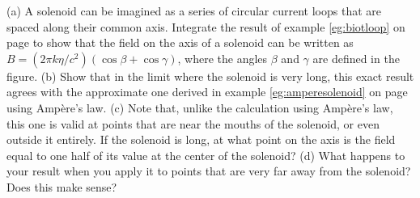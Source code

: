         (a) A solenoid can be imagined as a series of circular current loops that are spaced
        along their common axis.
        Integrate the result of example \ref{eg:biotloop} on page
        \pageref{eg:biotloop} to show that the field
        on the axis of a solenoid can be written as
        $B=(2\pi k\eta/c^2)(\cos\beta+\cos\gamma)$, where the angles $\beta$ and
        $\gamma$ are defined in the figure.\hwendpart
        (b) Show that in the limit where the solenoid is very long, this exact result
        agrees with the approximate one derived in example
        \ref{eg:amperesolenoid} on page \pageref{eg:amperesolenoid} using Amp\`{e}re's
        law.\hwendpart
        (c) Note that, unlike the calculation using Amp\`{e}re's law, this one is valid
        at points that are near the mouths of the solenoid, or even outside it entirely.
        If the solenoid is long, at what point on the axis is the field equal to one
        half of its value at the center of the solenoid?\hwendpart
        (d) What happens to your result when you apply it to points that are very far away
        from the solenoid? Does this make sense?
